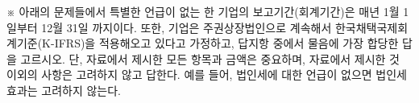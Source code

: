 \begin{framedtext}
※ 아래의 문제들에서 특별한 언급이 없는 한 기업의 보고기간(회계기간)은 매년 1월 1일부터 12월 31일 까지이다. 또한, 기업은 주권상장법인으로 계속해서 한국채택국제회계기준(K-IFRS)을 적용해오고 있다고 가정하고, 답지항 중에서 물음에 가장 합당한 답을 고르시오. 단, 자료에서 제시한 모든 항목과 금액은 중요하며, 자료에서 제시한 것 이외의 사항은 고려하지 않고 답한다. 예를 들어, 법인세에 대한 언급이 없으면 법인세 효과는 고려하지 않는다. \par
\end{framedtext}

